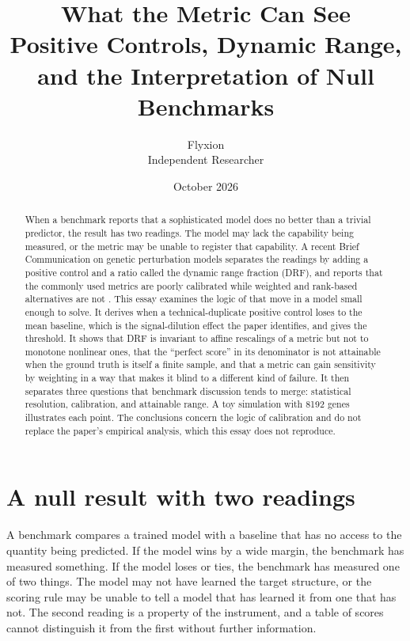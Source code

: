 \documentclass[11pt]{article}
\title{What the Metric Can See\\[4pt]
\large Positive Controls, Dynamic Range, and the Interpretation of Null Benchmarks}
\author{Flyxion\\Independent Researcher}
\date{October 2026}
\theoremstyle{definition}
\begin{document}
\maketitle

\begin{abstract}
\noindent
When a benchmark reports that a sophisticated model does no better than a trivial predictor, the result has two readings. The model may lack the capability being measured, or the metric may be unable to register that capability. A recent Brief Communication on genetic perturbation models separates the readings by adding a positive control and a ratio called the dynamic range fraction (DRF), and reports that the commonly used metrics are poorly calibrated while weighted and rank-based alternatives are not \citep{miller2026}. This essay examines the logic of that move in a model small enough to solve. It derives when a technical-duplicate positive control loses to the mean baseline, which is the signal-dilution effect the paper identifies, and gives the threshold. It shows that DRF is invariant to affine rescalings of a metric but not to monotone nonlinear ones, that the ``perfect score'' in its denominator is not attainable when the ground truth is itself a finite sample, and that a metric can gain sensitivity by weighting in a way that makes it blind to a different kind of failure. It then separates three questions that benchmark discussion tends to merge: statistical resolution, calibration, and attainable range. A toy simulation with 8192 genes illustrates each point. The conclusions concern the logic of calibration and do not replace the paper's empirical analysis, which this essay does not reproduce.
\end{abstract}

\section{A null result with two readings}

A benchmark compares a trained model with a baseline that has no access to the quantity being predicted. If the model wins by a wide margin, the benchmark has measured something. If the model loses or ties, the benchmark has measured one of two things. The model may not have learned the target structure, or the scoring rule may be unable to tell a model that has learned it from one that has not. The second reading is a property of the instrument, and a table of scores cannot distinguish it from the first without further information.
\end{document}
